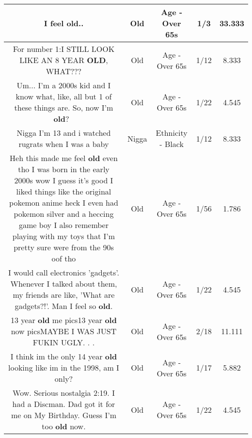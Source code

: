 \documentclass[11pt]{article}
\newlength\mylength
\begin{document}
\begin{center}
\begin{longtable}{|C{.65\mylength}|C{.30\mylength}|C{.12\mylength}|C{.12\mylength}|C{.12\mylength}|}
  \small I feel \textbf{old}..\normalsize   & Old & Age - Over 65s & 1/3 & 33.333 \\  \hline
  \small For number 1:I STILL LOOK LIKE AN 8 YEAR \textbf{OLD}, WHAT???\normalsize   & Old & Age - Over 65s & 1/12 & 8.333 \\  \hline
  \small Um... I'm a 2000s kid and I know what, like, all but 1 of these things are. So, now I'm \textbf{old}? 🤔\normalsize   & Old & Age - Over 65s & 1/22 & 4.545 \\  \hline
  \small Nigga I'm 13 and i watched rugrats when I was a baby\normalsize   & Nigga & Ethnicity - Black & 1/12 & 8.333 \\  \hline
  \small Heh this made me feel \textbf{old} even tho I was born in the early 2000s wow I guess it's good I liked things like the original pokemon anime heck I even had pokemon silver and a heccing game boy I also remember playing with my toys that I'm pretty sure were from the 90s oof tho\normalsize   & Old & Age - Over 65s & 1/56 & 1.786 \\  \hline
  \small I would call electronics 'gadgets'. Whenever I talked about them, my friends are like, 'What are gadgets?!'. Man I feel so \textbf{old}.\normalsize   & Old & Age - Over 65s & 1/22 & 4.545 \\  \hline
  \small 13 year \textbf{old} me pics13 year \textbf{old} now picsMAYBE I WAS JUST FUKIN UGLY. . .\normalsize   & Old & Age - Over 65s & 2/18 & 11.111 \\  \hline
  \small I think im the only 14 year \textbf{old} looking like im in the 1998, am I only?\normalsize   & Old & Age - Over 65s & 1/17 & 5.882 \\  \hline
  \small Wow. Serious nostalgia \@ 2:19. I had a Discman. Dad got it for me on My Birthday. Guess I'm too \textbf{old} now.\normalsize   & Old & Age - Over 65s & 1/22 & 4.545 \\  \hline

\end{longtable}
\end{center}
\end{document}
